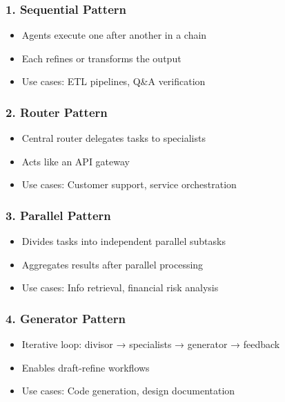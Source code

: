 \begin{frame}[fragile]\frametitle{1. Sequential Pattern}
    \begin{itemize}
        \item Agents execute one after another in a chain
        \item Each refines or transforms the output
        \item Use cases: ETL pipelines, Q\&A verification
    \end{itemize}
\end{frame}

\begin{frame}[fragile]\frametitle{2. Router Pattern}
    \begin{itemize}
        \item Central router delegates tasks to specialists
        \item Acts like an API gateway
        \item Use cases: Customer support, service orchestration
    \end{itemize}
\end{frame}

\begin{frame}[fragile]\frametitle{3. Parallel Pattern}
    \begin{itemize}
        \item Divides tasks into independent parallel subtasks
        \item Aggregates results after parallel processing
        \item Use cases: Info retrieval, financial risk analysis
    \end{itemize}
\end{frame}

\begin{frame}[fragile]\frametitle{4. Generator Pattern}
    \begin{itemize}
        \item Iterative loop: divisor → specialists → generator → feedback
        \item Enables draft-refine workflows
        \item Use cases: Code generation, design documentation
    \end{itemize}
\end{frame}

